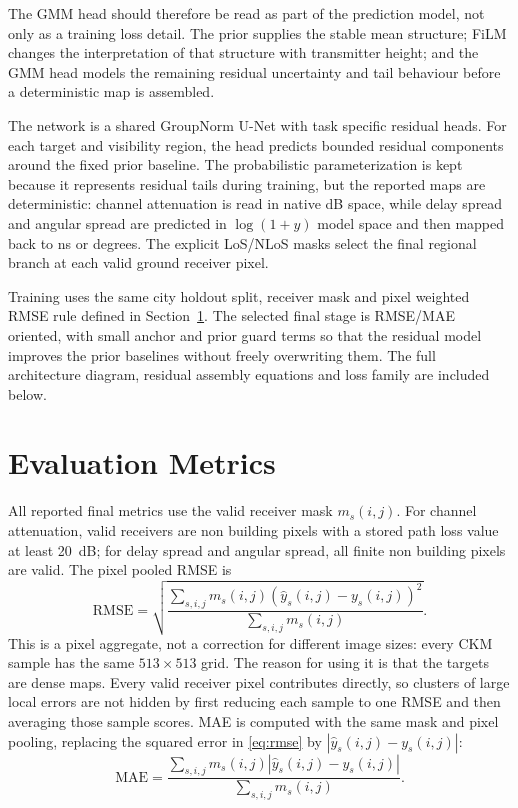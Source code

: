 The GMM head should therefore be read as part of the prediction model, not only
as a training loss detail. The prior supplies the stable mean structure; FiLM
changes the interpretation of that structure with transmitter height; and the
GMM head models the remaining residual uncertainty and tail behaviour before a
deterministic map is assembled.

The network is a shared GroupNorm U-Net with task specific residual heads. For
each target and visibility region, the head predicts bounded residual
components around the fixed prior baseline. The probabilistic parameterization is kept
because it represents residual tails during training, but the reported maps are
deterministic: channel attenuation is read in native dB space, while delay
spread and angular spread are predicted in \(\log(1+y)\) model space and then
mapped back to ns or degrees. The explicit LoS/NLoS masks select the final
regional branch at each valid ground receiver pixel.

Training uses the same city holdout split, receiver mask and pixel weighted
RMSE rule defined in Section~\ref{sec:evaluation_metrics}. The selected final stage is
RMSE/MAE oriented, with small anchor and prior guard terms so that the residual
model improves the prior baselines without freely overwriting them. The full
architecture diagram, residual assembly equations and loss family are included
below.



\clearpage

\section{Evaluation Metrics}
\label{sec:evaluation_metrics}

All reported final metrics use the valid receiver mask \(m_s(i,j)\). For
channel attenuation, valid receivers are non building pixels with a stored path
loss value at least \SI{20}{dB}; for delay spread and angular spread, all
finite non building pixels are valid. The pixel pooled RMSE is
\begin{equation}
  \mathrm{RMSE}
  =
  \sqrt{
  \frac{\sum_{s,i,j} m_s(i,j)\left(\hat y_s(i,j)-y_s(i,j)\right)^2}
       {\sum_{s,i,j} m_s(i,j)}
  }.
  \label{eq:rmse}
\end{equation}
This is a pixel aggregate, not a correction for different image sizes: every
CKM sample has the same \(513\times513\) grid. The reason for using it is that
the targets are dense maps. Every valid receiver pixel contributes directly, so
clusters of large local errors are not hidden by first reducing each sample to
one RMSE and then averaging those sample scores. MAE is computed with the same
mask and pixel pooling, replacing the squared error in \eqref{eq:rmse} by
\(|\hat y_s(i,j)-y_s(i,j)|\):
\begin{equation}
  \mathrm{MAE}
  =
  \frac{\sum_{s,i,j} m_s(i,j)\left|\hat y_s(i,j)-y_s(i,j)\right|}
       {\sum_{s,i,j} m_s(i,j)}.
  \label{eq:mae}
\end{equation}

